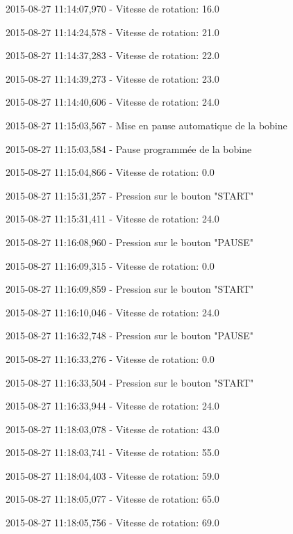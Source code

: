 \documentclass[a4paper, 11pt]{article}
\begin{document}
2015-08-27 11\string:14\string:07,970 - Vitesse de rotation\string: 16.0

2015-08-27 11\string:14\string:24,578 - Vitesse de rotation\string: 21.0

2015-08-27 11\string:14\string:37,283 - Vitesse de rotation\string: 22.0

2015-08-27 11\string:14\string:39,273 - Vitesse de rotation\string: 23.0

2015-08-27 11\string:14\string:40,606 - Vitesse de rotation\string: 24.0

2015-08-27 11\string:15\string:03,567 - Mise en pause automatique de la bobine

2015-08-27 11\string:15\string:03,584 - Pause programmée de la bobine

2015-08-27 11\string:15\string:04,866 - Vitesse de rotation\string: 0.0

2015-08-27 11\string:15\string:31,257 - Pression sur le bouton "START"

2015-08-27 11\string:15\string:31,411 - Vitesse de rotation\string: 24.0

2015-08-27 11\string:16\string:08,960 - Pression sur le bouton "PAUSE"

2015-08-27 11\string:16\string:09,315 - Vitesse de rotation\string: 0.0

2015-08-27 11\string:16\string:09,859 - Pression sur le bouton "START"

2015-08-27 11\string:16\string:10,046 - Vitesse de rotation\string: 24.0

2015-08-27 11\string:16\string:32,748 - Pression sur le bouton "PAUSE"

2015-08-27 11\string:16\string:33,276 - Vitesse de rotation\string: 0.0

2015-08-27 11\string:16\string:33,504 - Pression sur le bouton "START"

2015-08-27 11\string:16\string:33,944 - Vitesse de rotation\string: 24.0

2015-08-27 11\string:18\string:03,078 - Vitesse de rotation\string: 43.0

2015-08-27 11\string:18\string:03,741 - Vitesse de rotation\string: 55.0

2015-08-27 11\string:18\string:04,403 - Vitesse de rotation\string: 59.0

2015-08-27 11\string:18\string:05,077 - Vitesse de rotation\string: 65.0

2015-08-27 11\string:18\string:05,756 - Vitesse de rotation\string: 69.0
\end{document}
